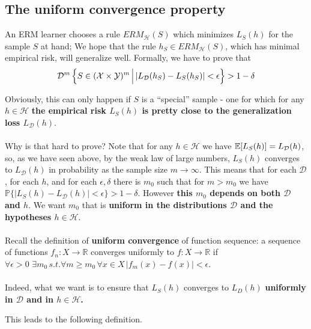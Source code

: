 \documentclass[11pt]{article}
\newcommand{\R}{\ensuremath{\mathbb{R}}}
\newcommand{\Prob}{\ensuremath{\mathbb{P}}}
\newcommand{\Dc}{\mathcal{D}}
\newcommand{\Hc}{\mathcal{H}}
\begin{document}
    \subsection{The uniform convergence property}

    An ERM learner chooses a rule $ERM_\Hc(S)$ which minimizes 
$L_S(h)$ for the sample $S$ at hand; 
We hope that the rule $h_S\in ERM_\Hc(S)$, which has minimal empirical risk,
will generalize well.
Formally, we have to prove that 
  \[
    \mathcal{D}^m\left\{ S\in(\mathcal{X}\times\mathcal{Y})^m\,\Big|\, |L_{\mathcal{D}}(h_S)-L_S(h_S)|<\epsilon
    \right\}>1-\delta
  \]

  Obviously, this can only happen if $S$ is a ``special'' sample - one for which
for any $h\in\Hc$ {\bf the empirical risk $L_S(h)$ is pretty close to the
generalization loss $L_\Dc(h)$}. 
\\~\\
Why is that hard to prove? Note that for any $h\in\Hc$ we have
$\E[L_S(h)]=L_\Dc(h)$, so, as we have seen above, by the weak law of large numbers, $L_S(h)$
converges to $L_\Dc(h)$ in probability as the sample size $m\to\infty$.
This means that  
for each $\Dc$, for each $h$,
and for each $\epsilon,\delta$ there is $m_0$ such that for $m>m_0$ we have
$\Prob\{|L_S(h)-L_\Dc(h)|<\epsilon\}>1-\delta$. However {\bf this $m_0$ depends on
both $\Dc$ and $h$}. We want $m_0$ that is {\bf uniform in the distributions
  $\Dc$ and 
the hypotheses $h\in\Hc$}. 
\\~\\
Recall the definition of {\bf uniform convergence} of
function sequence: a sequence of functions $f_n:X\to\R$ converges uniformly to
$f:X\to\R$ 
if $\forall\epsilon>0 \,\, \exists m_0 \, s.t. \forall m\geq m_0\,\forall x\in X\,
|f_m(x)-f(x)|<\epsilon$. 
\\~\\
Indeed, what we want is to ensure that $L_S(h)$ converges to $L_D(h)$ 
{\bf uniformly in $\Dc$ {\bf and} in
$h\in\Hc$. }





This leads to the following definition. 




\end{document}
